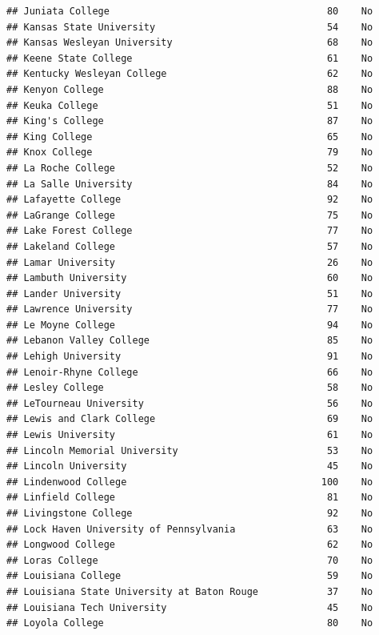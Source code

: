 \documentclass[
]{article}
\begin{document}
\begin{verbatim}
## Juniata College                                      80    No
## Kansas State University                              54    No
## Kansas Wesleyan University                           68    No
## Keene State College                                  61    No
## Kentucky Wesleyan College                            62    No
## Kenyon College                                       88    No
## Keuka College                                        51    No
## King's College                                       87    No
## King College                                         65    No
## Knox College                                         79    No
## La Roche College                                     52    No
## La Salle University                                  84    No
## Lafayette College                                    92    No
## LaGrange College                                     75    No
## Lake Forest College                                  77    No
## Lakeland College                                     57    No
## Lamar University                                     26    No
## Lambuth University                                   60    No
## Lander University                                    51    No
## Lawrence University                                  77    No
## Le Moyne College                                     94    No
## Lebanon Valley College                               85    No
## Lehigh University                                    91    No
## Lenoir-Rhyne College                                 66    No
## Lesley College                                       58    No
## LeTourneau University                                56    No
## Lewis and Clark College                              69    No
## Lewis University                                     61    No
## Lincoln Memorial University                          53    No
## Lincoln University                                   45    No
## Lindenwood College                                  100    No
## Linfield College                                     81    No
## Livingstone College                                  92    No
## Lock Haven University of Pennsylvania                63    No
## Longwood College                                     62    No
## Loras College                                        70    No
## Louisiana College                                    59    No
## Louisiana State University at Baton Rouge            37    No
## Louisiana Tech University                            45    No
## Loyola College                                       80    No

\end{verbatim}
\end{document}
